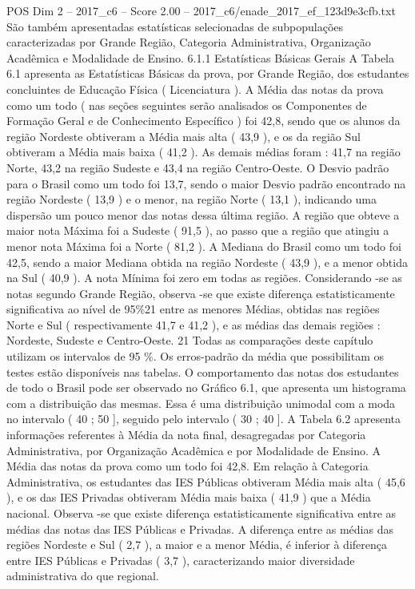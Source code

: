 \begin{textsample}{POS Dim 2 – 2017\_c6 – Score 2.00 – 2017\_c6/enade\_2017\_ef\_123d9e3cfb.txt}
São também apresentadas estatísticas selecionadas de subpopulações caracterizadas por Grande Região, Categoria Administrativa, Organização Acadêmica e Modalidade de Ensino. 6.1.1 Estatísticas Básicas Gerais A Tabela 6.1 apresenta as Estatísticas Básicas da prova, por Grande Região, dos estudantes concluintes de Educação Física ( Licenciatura ).
A Média das notas da prova como um todo ( nas seções seguintes serão analisados os Componentes de Formação Geral e de Conhecimento Específico ) foi 42,8, sendo que os alunos da região Nordeste obtiveram a Média mais alta ( 43,9 ), e os da região Sul obtiveram a Média mais baixa ( 41,2 ).
As demais médias foram : 41,7 na região Norte, 43,2 na região Sudeste e 43,4 na região Centro-Oeste.
O Desvio padrão para o Brasil como um todo foi 13,7, sendo o maior Desvio padrão encontrado na região Nordeste ( 13,9 ) e o menor, na região Norte ( 13,1 ), indicando uma dispersão um pouco menor das notas dessa última região.
A região que obteve a maior nota Máxima foi a Sudeste ( 91,5 ), ao passo que a região que atingiu a menor nota Máxima foi a Norte ( 81,2 ).
A Mediana do Brasil como um todo foi 42,5, sendo a maior Mediana obtida na região Nordeste ( 43,9 ), e a menor obtida na Sul ( 40,9 ).
A nota Mínima foi zero em todas as regiões.
Considerando -se as notas segundo Grande Região, observa -se que existe diferença estatisticamente significativa ao nível de 95\%21 entre as menores Médias, obtidas nas regiões Norte e Sul ( respectivamente 41,7 e 41,2 ), e as médias das demais regiões : Nordeste, Sudeste e Centro-Oeste. 21 Todas as comparações deste capítulo utilizam os intervalos de 95 \%.
Os erros-padrão da média que possibilitam os testes estão disponíveis nas tabelas.
O comportamento das notas dos estudantes de todo o Brasil pode ser observado no Gráfico 6.1, que apresenta um histograma com a distribuição das mesmas.
Essa é uma distribuição unimodal com a moda no intervalo ( 40 ; 50 ], seguido pelo intervalo ( 30 ; 40 ].
A Tabela 6.2 apresenta informações referentes à Média da nota final, desagregadas por Categoria Administrativa, por Organização Acadêmica e por Modalidade de Ensino.
A Média das notas da prova como um todo foi 42,8.
Em relação à Categoria Administrativa, os estudantes das IES Públicas obtiveram Média mais alta ( 45,6 ), e os das IES Privadas obtiveram Média mais baixa ( 41,9 ) que a Média nacional.
Observa -se que existe diferença estatisticamente significativa entre as médias das notas das IES Públicas e Privadas.
A diferença entre as médias das regiões Nordeste e Sul ( 2,7 ), a maior e a menor Média, é inferior à diferença entre IES Públicas e Privadas ( 3,7 ), caracterizando maior diversidade administrativa do que regional.

\end{textsample}

